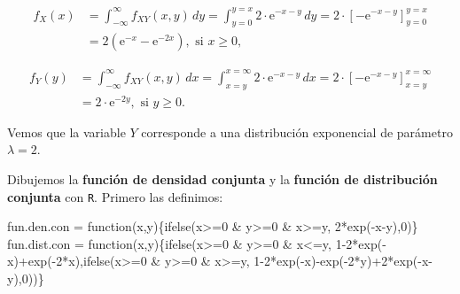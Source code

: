 \documentclass[
  letterpaper,
  DIV=11,
  numbers=noendperiod]{scrreprt}
\newenvironment{Shaded}{\begin{snugshade}}{\end{snugshade}}
\newcommand{\ControlFlowTok}[1]{\textcolor[rgb]{0.00,0.23,0.31}{#1}}
\newcommand{\DecValTok}[1]{\textcolor[rgb]{0.68,0.00,0.00}{#1}}
\newcommand{\FunctionTok}[1]{\textcolor[rgb]{0.28,0.35,0.67}{#1}}
\newcommand{\NormalTok}[1]{\textcolor[rgb]{0.00,0.23,0.31}{#1}}
\newcommand{\OtherTok}[1]{\textcolor[rgb]{0.00,0.23,0.31}{#1}}
\newcommand{\SpecialCharTok}[1]{\textcolor[rgb]{0.37,0.37,0.37}{#1}}
\begin{document}
\[
\begin{array}{rl}
f_X(x) &=   \int_{-\infty}^{\infty} f_{XY}(x,y)\, dy =\int_{y=0}^{y=x}2\cdot\mathrm{e}^{-x-y}\, dy = 2\cdot\left[-\mathrm{e}^{-x-y}\right]_{y=0}^{y=x} \\ &=   2\left(\mathrm{e}^{-x}-\mathrm{e}^{-2x}\right),\mbox{ si }x\geq 0,
\end{array}
\]

\[
\begin{array}{rl}
f_Y(y) & =  \int_{-\infty}^{\infty} f_{XY}(x,y)\, dx =\int_{x=y}^{x=\infty}2\cdot\mathrm{e}^{-x-y}\, dx = 2\cdot\left[-\mathrm{e}^{-x-y}\right]_{x=y}^{x=\infty}\\ &= 2\cdot\mathrm{e}^{-2y}, \mbox{ si }y\geq 0.
\end{array}
\]

Vemos que la variable \(Y\) corresponde a una distribución exponencial
de parámetro \(\lambda =2\).

Dibujemos la \textbf{función de densidad conjunta} y la \textbf{función
de distribución conjunta} con \texttt{R}. Primero las definimos:

\begin{Shaded}
\begin{Highlighting}[]
\NormalTok{fun.den.con }\OtherTok{=} \ControlFlowTok{function}\NormalTok{(x,y)\{}\FunctionTok{ifelse}\NormalTok{(x}\SpecialCharTok{\textgreater{}=}\DecValTok{0} \SpecialCharTok{\&}\NormalTok{ y}\SpecialCharTok{\textgreater{}=}\DecValTok{0} \SpecialCharTok{\&}\NormalTok{ x}\SpecialCharTok{\textgreater{}=}\NormalTok{y,}
                                   \DecValTok{2}\SpecialCharTok{*}\FunctionTok{exp}\NormalTok{(}\SpecialCharTok{{-}}\NormalTok{x}\SpecialCharTok{{-}}\NormalTok{y),}\DecValTok{0}\NormalTok{)\}}
\NormalTok{fun.dist.con }\OtherTok{=} \ControlFlowTok{function}\NormalTok{(x,y)\{}\FunctionTok{ifelse}\NormalTok{(x}\SpecialCharTok{\textgreater{}=}\DecValTok{0} \SpecialCharTok{\&}\NormalTok{ y}\SpecialCharTok{\textgreater{}=}\DecValTok{0} \SpecialCharTok{\&}\NormalTok{ x}\SpecialCharTok{\textless{}=}\NormalTok{y,}
                    \DecValTok{1{-}2}\SpecialCharTok{*}\FunctionTok{exp}\NormalTok{(}\SpecialCharTok{{-}}\NormalTok{x)}\SpecialCharTok{+}\FunctionTok{exp}\NormalTok{(}\SpecialCharTok{{-}}\DecValTok{2}\SpecialCharTok{*}\NormalTok{x),}\FunctionTok{ifelse}\NormalTok{(x}\SpecialCharTok{\textgreater{}=}\DecValTok{0} \SpecialCharTok{\&}\NormalTok{ y}\SpecialCharTok{\textgreater{}=}\DecValTok{0} \SpecialCharTok{\&}\NormalTok{ x}\SpecialCharTok{\textgreater{}=}\NormalTok{y,}
                    \DecValTok{1{-}2}\SpecialCharTok{*}\FunctionTok{exp}\NormalTok{(}\SpecialCharTok{{-}}\NormalTok{x)}\SpecialCharTok{{-}}\FunctionTok{exp}\NormalTok{(}\SpecialCharTok{{-}}\DecValTok{2}\SpecialCharTok{*}\NormalTok{y)}\SpecialCharTok{+}\DecValTok{2}\SpecialCharTok{*}\FunctionTok{exp}\NormalTok{(}\SpecialCharTok{{-}}\NormalTok{x}\SpecialCharTok{{-}}\NormalTok{y),}\DecValTok{0}\NormalTok{))\}}
\end{Highlighting}
\end{Shaded}
\end{document}
